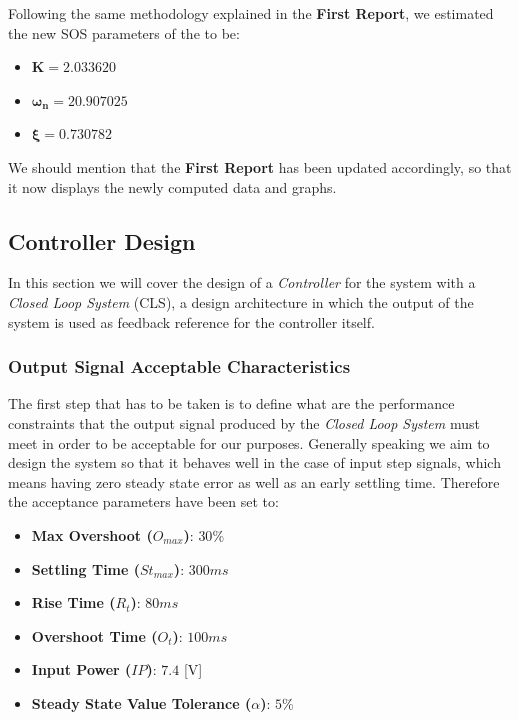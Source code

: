 Following the same methodology explained in the \textbf{First Report}, we estimated the new SOS parameters of the \LEGOMOTOR{} to be:

\begin{itemize}
	\item $\mathbf{K} = 2.033620$
	\item $\mathbf{\omega_n} = 20.907025$
	\item $\mathbf{\xi} = 0.730782$
\end{itemize}

We should mention that the \textbf{First Report} has been updated accordingly, so that it now displays the newly computed data and graphs.

\subsection{Controller Design}

In this section we will cover the design of a \emph{Controller} for the \LEGOMOTOR{} system with a \textit{Closed Loop System} (CLS), a design architecture in which the output of the system is used as feedback reference for the controller itself.

\subsubsection{Output Signal Acceptable Characteristics}

The first step that has to be taken is to define what are the performance constraints that the output signal produced by the \textit{Closed Loop System} must meet in order to be acceptable for our purposes. Generally speaking we aim to design the system so that it behaves well in the case of input step signals, which means having zero steady state error as well as an early settling time. Therefore the acceptance parameters have been set to:

\begin{itemize}
	\item \textbf{Max Overshoot ($O_{max}$)}: $30\%$
	\item \textbf{Settling Time ($St_{max}$)}: $300 ms$
	\item \textbf{Rise Time ($R_t$)}: $80 ms$
	\item \textbf{Overshoot Time ($O_t$)}: $100 ms$
	\item \textbf{Input Power ($IP$)}: $7.4$ [V]
	\item \textbf{Steady State Value Tolerance ($\alpha{}$)}: $5\%$
\end{itemize}

